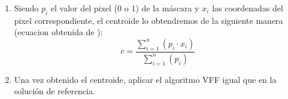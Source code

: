 \begin{itemize}
\begin{enumerate}
		\item Siendo $p_{i}$ el valor del pixel (0 o 1) de la máscara y $x_i$ las coordenadas del pixel correspondiente, el centroide lo obtendremos de la siguiente manera (ecuacion obtenida de \cite{centroide_ecuacion}):
		\begin{equation*}
		c = \frac{\sum_{i=1}^n\left(p_i \cdot x_i\right)}{\sum_{i=1}^n\left(p_i\right)}
		\end{equation*}
		\item Una vez obtenido el centroide, aplicar el algoritmo VFF igual que en la solución de referencia.
	\end{enumerate}
\end{itemize}

